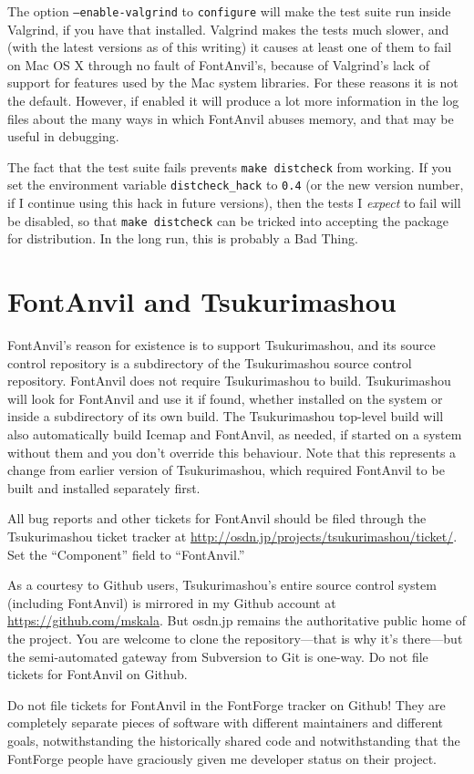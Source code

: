 The option \texttt{--enable-valgrind} to \texttt{configure} will make the
test suite run inside Valgrind, if you have that installed.  Valgrind
makes the tests much slower, and (with the latest versions as of this
writing) it causes at least one of them to fail on Mac OS X through no fault
of FontAnvil's, because of Valgrind's lack of support for features used by
the Mac system libraries.  For these reasons it is not the default. 
However, if enabled it will produce a lot more information in the log files
about the many ways in which FontAnvil abuses memory, and that may be useful
in debugging.

The fact that the test suite fails prevents \texttt{make distcheck} from
working.  If you set the environment variable \texttt{distcheck\_hack} to
\texttt{0.4} (or the new version number, if I continue using this hack in
future versions), then the tests I \emph{expect} to fail will be disabled,
so that \texttt{make distcheck} can be tricked into accepting the package
for distribution.  In the long run, this is probably a Bad Thing.

\section{FontAnvil and Tsukurimashou}

FontAnvil's reason for existence is to support Tsukurimashou, and its source
control repository is a subdirectory of the Tsukurimashou source control
repository.  FontAnvil does not require Tsukurimashou to build. 
Tsukurimashou will look for FontAnvil and use it if found, whether installed
on the system or inside a subdirectory of its own build.  The Tsukurimashou
top-level build will also automatically build Icemap and FontAnvil, as
needed, if started on a system without them and you don't override this
behaviour.  Note that this represents a change from earlier version of
Tsukurimashou, which required FontAnvil to be built and installed separately
first.

All bug reports and other tickets for FontAnvil should be filed through
the Tsukurimashou ticket tracker at
\url{http://osdn.jp/projects/tsukurimashou/ticket/}.  Set the
``Component'' field to ``FontAnvil.''

As a courtesy to Github users, Tsukurimashou's entire source control system
(including FontAnvil) is mirrored in my Github account at
\url{https://github.com/mskala}.  But osdn.jp remains the
authoritative public home of the project.  You are welcome to clone the
repository---that is why it's there---but the semi-automated gateway from
Subversion to Git is one-way.  Do not file tickets for FontAnvil on Github.

Do not file tickets for FontAnvil in the FontForge tracker on Github!  They
are completely separate pieces of software with different maintainers and
different goals, notwithstanding the historically shared code and
notwithstanding that the FontForge people have graciously given me developer
status on their project.

\clearpage
